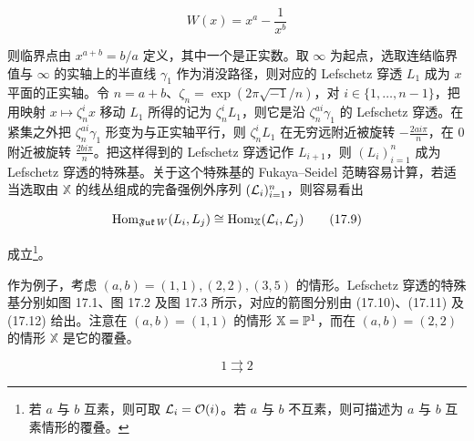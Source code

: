 \begin{equation}
  W(x) = x^a - \frac{1}{x^b} \tag{17.8}
\end{equation}

则临界点由 $x^{a+b}=b/a$ 定义，其中一个是正实数。取 $\infty$ 为起点，选取连结临界值与 $\infty$ 的实轴上的半直线 $\gamma_1$ 作为消没路径，则对应的 Lefschetz 穿透 $L_1$ 成为 $x$ 平面的正实轴。令 $n=a+b$、$\zeta_n=\exp(2\pi\sqrt{-1}/n)$，对 $i\in\{1,\dots,n-1\}$，把用映射 $x\mapsto\zeta_n^i x$ 移动 $L_1$ 所得的记为 $\zeta_n^i L_1$，则它是沿 $\zeta_n^{ai}\gamma_1$ 的 Lefschetz 穿透。在紧集之外把 $\zeta_n^{ai}\gamma_1$ 形变为与正实轴平行，则 $\zeta_n^i L_1$ 在无穷远附近被旋转 $-\frac{2ai\pi}{n}$，在 $0$ 附近被旋转 $\frac{2bi\pi}{n}$。把这样得到的 Lefschetz 穿透记作 $L_{i+1}$，则 $(L_i)_{i=1}^n$ 成为 Lefschetz 穿透的特殊基。关于这个特殊基的 Fukaya–Seidel 范畴容易计算，若适当选取由 $\mathbb{X}$ 的线丛组成的完备强例外序列 $(\mathcal{L}_i)_{i=1}^n$，则容易看出


\begin{equation}
  \operatorname{Hom}_{\mathfrak{Fuk}\,W}(L_i,L_j) \cong \operatorname{Hom}_{\mathbb{X}}(\mathcal{L}_i,\mathcal{L}_j) \tag{17.9}
\end{equation}

成立\footnote{若 $a$ 与 $b$ 互素，则可取 $\mathcal{L}_i=\mathcal{O}(i)$。若 $a$ 与 $b$ 不互素，则可描述为 $a$ 与 $b$ 互素情形的覆叠。}。

作为例子，考虑 $(a,b)=(1,1),(2,2),(3,5)$ 的情形。Lefschetz 穿透的特殊基分别如图 17.1、图 17.2 及图 17.3 所示，对应的箭图分别由 (17.10)、(17.11) 及 (17.12) 给出。注意在 $(a,b)=(1,1)$ 的情形 $\mathbb{X}=\mathbb{P}^1$，而在 $(a,b)=(2,2)$ 的情形 $\mathbb{X}$ 是它的覆叠。

\begin{equation}
  1 \rightrightarrows 2 \tag{17.10}
\end{equation}



